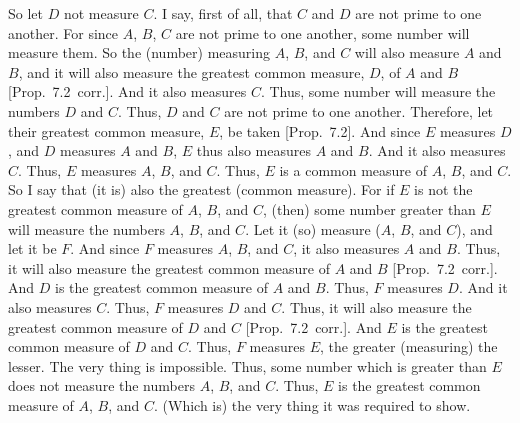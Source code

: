 \begin{Parallel}{}{}
{So let $D$ not measure $C$. I say, first of all, that $C$ and $D$ are not prime
to one another. For since $A$, $B$,  $C$ are not prime to one another,
some number will measure them. So the (number) measuring $A$, $B$, and
$C$ will also measure $A$ and $B$, and it will also measure the greatest common
measure, $D$,  of $A$ and $B$ [Prop.~7.2~corr.].
And it also measures $C$. Thus, some number will measure the numbers $D$ and
$C$. Thus, $D$ and $C$ are not prime to one another. Therefore, let their
greatest common measure, $E$, be taken  [Prop.~7.2]. And since $E$ measures $D$, and $D$
measures $A$ and $B$, $E$ thus also measures $A$ and $B$. And it also measures $C$.
Thus, $E$ measures $A$, $B$,  and $C$. Thus, $E$ is a common measure of
$A$, $B$,  and $C$. So I say that (it is) also the greatest (common measure).
For if $E$ is not the greatest common measure of $A$, $B$, and $C$, (then)
some number greater than $E$ will measure the numbers $A$, $B$,  and $C$.
Let it (so) measure ($A$, $B$, and $C$), and let it be $F$. And since $F$
measures $A$, $B$,  and $C$, it also measures $A$ and $B$. 
 Thus, it will also measure the greatest common measure of $A$ and $B$ [Prop.~7.2~corr.]. And $D$ is the greatest common measure
of $A$ and $B$. Thus,  $F$ measures $D$. And it also measures $C$. Thus, $F$
measures $D$ and $C$. Thus, it will also measure the greatest common
measure of $D$ and $C$ [Prop.~7.2~corr.]. And
$E$ is the greatest common measure of $D$ and $C$. Thus, $F$ measures $E$, the
greater (measuring) the lesser. The very thing is impossible. Thus,
some number which is greater than $E$ does not measure the numbers $A$, $B$, and $C$.
Thus, $E$ is the greatest common measure of $A$, $B$, and $C$. (Which is)
the very thing it was required to show.}
\end{Parallel}

